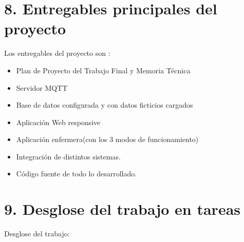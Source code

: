 \documentclass[
11pt, %
]{charter}
\begin{document}
\section{8. Entregables principales del proyecto}
\label{sec:entregables}



Los entregables del proyecto son :

\begin{itemize}
	\item Plan de Proyecto del Trabajo Final y Memoria Técnica
	\item Servidor MQTT 
	\item Base de datos configurada y con datos ficticios cargados
	\item Aplicación Web responsive
	\item Aplicación enfermera(con los 3 modos de funcionamiento)
	\item Integración de distintos sistemas.
	\item Código fuente de todo lo desarrollado.
\end{itemize}



\section{9. Desglose del trabajo en tareas}
\label{sec:wbs}


Desglose del trabajo:
\end{document}

